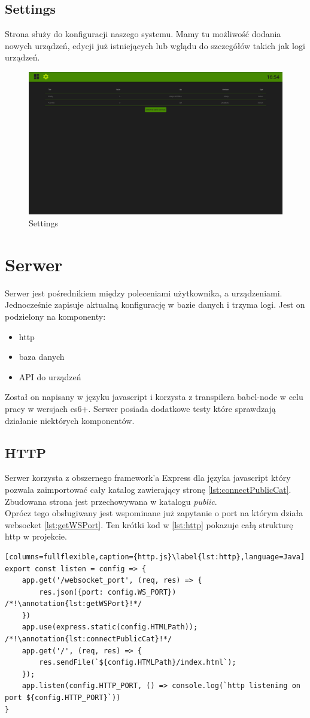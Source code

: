 \subsection{Settings}
Strona służy do konfiguracji naszego systemu. Mamy tu możliwość dodania nowych urządzeń, edycji już istniejących lub wglądu do szczegółów takich jak logi urządzeń.
\begin{figure}[h!]
  \includegraphics[width=\linewidth]{settings.png}
  \caption{Settings}
  \label{fig:settings}
\end{figure}
\newpage
\section{Serwer}
Serwer jest pośrednikiem między poleceniami użytkownika, a urządzeniami. Jednocześnie zapisuje aktualną konfigurację w bazie danych i trzyma logi. Jest on podzielony na komponenty:
\begin{itemize}
    \item http
    \item baza danych
    \item API do urządzeń
\end{itemize}
Został on napisany w języku javascript i korzysta z transpilera babel-node w celu pracy w wersjach es6+. Serwer posiada dodatkowe testy które sprawdzają działanie niektórych komponentów.
\subsection{HTTP}
Serwer korzysta z obszernego framework'a Express dla języka javascript który pozwala zaimportować cały katalog zawierający stronę \ref{lst:connectPublicCat}. Zbudowana strona jest przechowywana w katalogu \textit{public}. \cite{express}\\
Oprócz tego obsługiwany jest wspominane już zapytanie o port na którym działa websocket \ref{lst:getWSPort}.
Ten krótki kod w \ref{lst:http} pokazuje całą strukturę http w projekcie.
\begin{lstlisting}[columns=fullflexible,caption={http.js}\label{lst:http},language=Java]
export const listen = config => {
    app.get('/websocket_port', (req, res) => {
        res.json({port: config.WS_PORT}) /*!\annotation{lst:getWSPort}!*/
    })
    app.use(express.static(config.HTMLPath)); /*!\annotation{lst:connectPublicCat}!*/
    app.get('/', (req, res) => {
        res.sendFile(`${config.HTMLPath}/index.html`);
    });
    app.listen(config.HTTP_PORT, () => console.log(`http listening on port ${config.HTTP_PORT}`))
}
\end{lstlisting}
